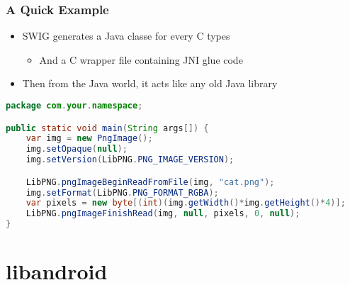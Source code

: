 \documentclass[10pt,mathserif]{beamer}
\begin{document}
	\begin{frame}[fragile]
		\frametitle{A Quick Example}

		\begin{itemize}
			\item SWIG generates a Java classe for every C types
			\begin{itemize}
				\item And a C wrapper file containing JNI glue code
			\end{itemize}
			\item Then from the Java world, it acts like any old Java library
		\end{itemize}

		\begin{lstlisting}[language=java]
package com.your.namespace;

public static void main(String args[]) {
	var img = new PngImage();
	img.setOpaque(null);
	img.setVersion(LibPNG.PNG_IMAGE_VERSION);

	LibPNG.pngImageBeginReadFromFile(img, "cat.png");
	img.setFormat(LibPNG.PNG_FORMAT_RGBA);
	var pixels = new byte[(int)(img.getWidth()*img.getHeight()*4)];
	LibPNG.pngImageFinishRead(img, null, pixels, 0, null);
}
		\end{lstlisting}
	\end{frame}

	\section{libandroid}
\end{document}

